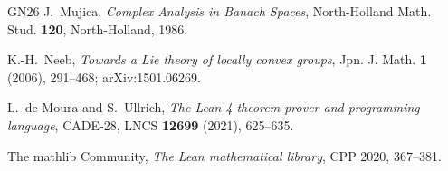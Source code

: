 \begin{thebibliography}{GN26}
J.~Mujica, \emph{Complex Analysis in Banach Spaces}, North-Holland Math. Stud. \textbf{120},
North-Holland, 1986.

K.-H.~Neeb, \emph{Towards a Lie theory of locally convex groups}, Jpn. J. Math. \textbf{1}
(2006), 291--468; arXiv:1501.06269.

L.~de Moura and S.~Ullrich, \emph{The Lean 4 theorem prover and programming language}, CADE-28,
LNCS \textbf{12699} (2021), 625--635.

The mathlib Community, \emph{The Lean mathematical library}, CPP 2020, 367--381.

\end{thebibliography}
